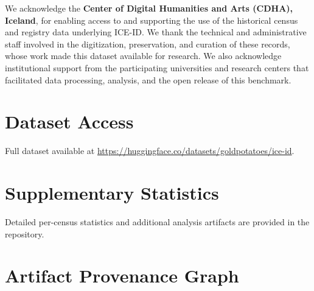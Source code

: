 \documentclass{article}
\begin{document}
We acknowledge the \textbf{Center of Digital Humanities and Arts (CDHA), Iceland}, for enabling access to and supporting the use of the historical census and registry data underlying ICE-ID. We thank the technical and administrative staff involved in the digitization, preservation, and curation of these records, whose work made this dataset available for research. We also acknowledge institutional support from the participating universities and research centers that facilitated data processing, analysis, and the open release of this benchmark.







\appendix

\section{Dataset Access}
Full dataset available at \url{https://huggingface.co/datasets/goldpotatoes/ice-id}.

\section{Supplementary Statistics}
Detailed per-census statistics and additional analysis artifacts are provided in the repository.

\section{Artifact Provenance Graph}
\end{document}
